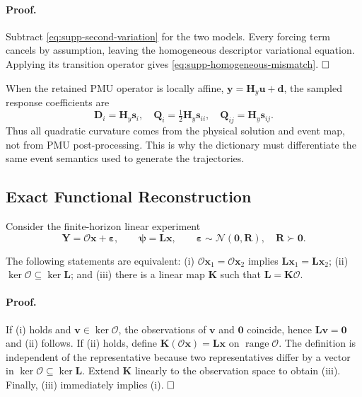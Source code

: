 \paragraph{Proof.}
Subtract \eqref{eq:supp-second-variation} for the two models. Every forcing term cancels by assumption, leaving the homogeneous descriptor variational equation. Applying its transition operator gives \eqref{eq:supp-homogeneous-mismatch}. $\hfill\square$

When the retained PMU operator is locally affine, $\bm y=\bm H_y\bm u+\bm d$, the sampled response coefficients are
\begin{equation}
 \bm D_i=\bm H_y\bm s_i,
 \quad
 \bm Q_i=\tfrac12\bm H_y\bm s_{ii},
 \quad
 \bm Q_{ij}=\bm H_y\bm s_{ij}.
 \label{eq:supp-pmu-manifold-coefficients}
\end{equation}
Thus all quadratic curvature comes from the physical solution and event map, not from PMU post-processing. This is why the dictionary must differentiate the same event semantics used to generate the trajectories.

\subsection{Exact Functional Reconstruction}

Consider the finite-horizon linear experiment
\begin{equation}
 \bm Y=\mathcal O\bm x+\bm\varepsilon,
 \qquad \bm\psi=\bm L\bm x,
 \qquad \bm\varepsilon\sim\mathcal N(\bm0,\bm R),
 \quad \bm R\succ\bm0.
 \label{eq:supp-functional-experiment}
\end{equation}

\begin{theorem}
The following statements are equivalent: (i) $\mathcal O\bm x_1=\mathcal O\bm x_2$ implies $\bm L\bm x_1=\bm L\bm x_2$; (ii) $\ker\mathcal O\subseteq\ker\bm L$; and (iii) there is a linear map $\bm K$ such that $\bm L=\bm K\mathcal O$.
\label{thm:supp-functional-equivalence}
\end{theorem}

\paragraph{Proof.}
If (i) holds and $\bm v\in\ker\mathcal O$, the observations of $\bm v$ and $\bm0$ coincide, hence $\bm L\bm v=\bm0$ and (ii) follows. If (ii) holds, define $\bm K(\mathcal O\bm x)=\bm L\bm x$ on $\operatorname{range}\mathcal O$. The definition is independent of the representative because two representatives differ by a vector in $\ker\mathcal O\subseteq\ker\bm L$. Extend $\bm K$ linearly to the observation space to obtain (iii). Finally, (iii) immediately implies (i). $\hfill\square$

